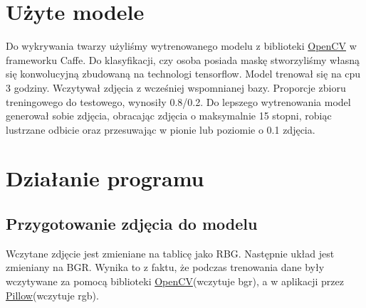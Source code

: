 \documentclass[12pt]{article}
\begin{document}
	\section{Użyte modele}
	Do wykrywania twarzy użyliśmy wytrenowanego modelu z biblioteki \href{https://opencv.org/}{OpenCV} w frameworku Caffe\cite{jia_caffe_2014}. Do klasyfikacji, czy osoba posiada maskę stworzyliśmy własną się konwolucyjną zbudowaną na technologi tensorflow\cite{tensorflow2015-whitepaper}. Model trenował się na cpu 3 godziny. Wczytywał zdjęcia z wcześniej wspomnianej bazy. Proporcje zbioru treningowego do testowego, wynosiły 0.8/0.2. Do lepszego wytrenowania model generował sobie zdjęcia, obracając zdjęcia o maksymalnie 15 stopni, robiąc lustrzane odbicie oraz przesuwając w pionie lub poziomie o 0.1 zdjęcia.
	\section{Działanie programu}
		\subsection{Przygotowanie zdjęcia do modelu}
		Wczytane zdjęcie jest zmieniane na tablicę jako RBG. Następnie układ jest zmieniany na BGR. Wynika to z faktu, że podczas trenowania dane były wczytywane za pomocą biblioteki \href{https://opencv.org/}{OpenCV}(wczytuje bgr), a w aplikacji przez \href{https://pillow.readthedocs.io/en/stable/}{Pillow}(wczytuje rgb).
		
\end{document}
